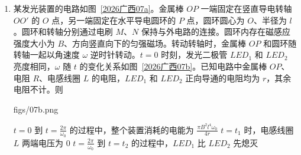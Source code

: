 \documentclass[\gkver]{gaokaozhenti}
\begin{document}
\begin{enumerate}
{由几何关系可知，粒子在磁场中运动轨迹对应的圆心角为 $\theta = 60^\circ$，则粒子在磁场内的运动时间 $t = \frac{\theta}{2\pi} \cdot \frac{2\pi r}{v_0} = \frac{\pi m}{3qB}$，故 C 正确，D 错误。

故选 C。
}
\item
某发光装置的电路如图~\ref{2026广西07a}。金属棒 $OP$ 一端固定在竖直导电转轴 $OO'$ 的 $O$ 点，另一端固定在水平导电圆环的 $P$ 点，圆环圆心为 $O$、半径为 $l$。圆环和转轴分别通过电刷 $M$、$N$ 保持与外电路的连接。圆环内存在磁感应强度大小为 $B$、方向竖直向下的匀强磁场。转动转轴时，金属棒 $OP$ 和圆环随转轴一起以角速度 $\omega$ 逆时针转动。$t = 0$ 时刻，发光二极管 $LED_{1}$ 和 $LED_{2}$ 亮度相同，$\omega$ 随 $t$ 的变化关系如图~\ref{2026广西07b}。已知电路中金属棒 $OP$、电阻 $R$、电感线圈 $L$ 的电阻，$LED_{1}$ 和 $LED_{2}$ 正向导通的电阻均为 $r$，其余电阻不计。则 

{figs/07b.png}

{$t = 0$ 到 $t = \frac{2\pi}{\omega_{0}}$ 的过程中，整个装置消耗的电能为 $\frac{\pi B^{2}l^{4}\omega_{0}}{4r}$}
{$t = t_{1}$ 时，电感线圈 $L$ 两端电压为 0}
{$t = \frac{2\pi}{\omega_{0}}$ 到 $t = t_{2}$ 的过程中，$LED_{1}$ 比 $LED_{2}$ 先熄灭}


\end{enumerate}
\end{document}
